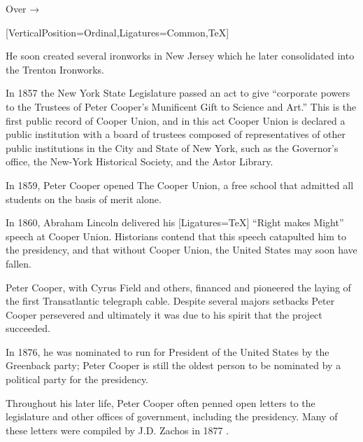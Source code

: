 \documentclass{article}
\begin{document}
\hfill Over { →}
%
%
\newpage{}
%
%
\begin{minipage}[t]{0.45\linewidth}
[VerticalPosition=Ordinal,Ligatures={Common,TeX}]
\fontsize{11pt}{13pt}\selectfont
\raggedright
\upshape
\begin{enumList}
\setcounter{enumListi}{\value{enumTemp}}

\item He soon created several ironworks in New Jersey which he later
consolidated into the { Trenton Ironworks}.

\item In 1857 the New York State Legislature passed an act to give ``corporate
powers to the Trustees of Peter Cooper's Munificent Gift to Science and Art.''
This is the first public record of Cooper Union, and in this act Cooper Union is
declared a { public institution with a board of
trustees composed of representatives of other public institutions in the City and
State of New York}, such as the Governor's office, the New-York Historical
Society, and the Astor Library.

\item In 1859, Peter Cooper opened The Cooper Union, a {
free school that admitted all students on the basis of merit alone.}
\item In 1860, { Abraham Lincoln} delivered his
{[Ligatures=TeX] ``Right makes Might''} speech at Cooper
Union.
Historians contend that this speech catapulted him to the presidency, and that
{ without Cooper Union, the United States may soon have
fallen.}

\item Peter Cooper, with Cyrus Field and others, financed and
pioneered the laying of the { first Transatlantic
telegraph cable}. Despite several majors setbacks Peter Cooper persevered and
ultimately it was due to his spirit that the project succeeded.

\item In 1876, he was { nominated to run for President of
the United States} by the Greenback party; Peter Cooper is still the
{ oldest person} to be nominated by a political party for
the presidency.

\item Throughout his later life, Peter Cooper often penned open letters to the
legislature and other offices of government, including the presidency. Many of
these letters were compiled by J.D. Zachos in 1877 \cite{opinions}.


\end{enumList}
\end{minipage}
\end{document}
